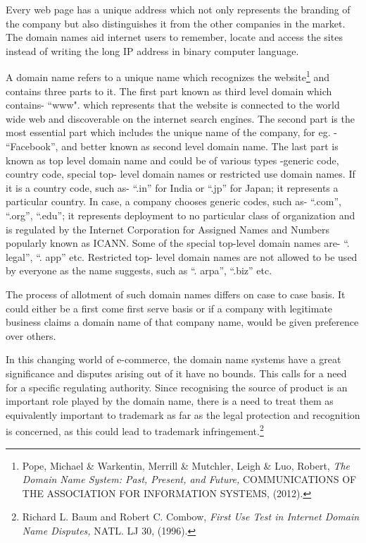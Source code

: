 \begin{multicols}{2}



\noi
Every web page has a unique address which not only represents the branding of the company
but also distinguishes it from the other companies in the market. The domain names aid
internet users to remember, locate and access the sites instead of writing the long IP address
in binary computer language.

\noi
A domain name refers to a unique name which recognizes the website\footnote{Pope, Michael \& Warkentin, Merrill \& Mutchler, Leigh \& Luo, Robert, \textit{The Domain Name System: Past, Present, and Future,} COMMUNICATIONS OF THE ASSOCIATION FOR INFORMATION SYSTEMS, (2012).}
 and contains three parts to it. The first part known as third level domain which contains- “www". which
represents that the website is connected to the world wide web and discoverable on the
internet search engines. The second part is the most essential part which includes the unique
name of the company, for eg. - “Facebook”, and better known as second level domain name.
The last part is known as top level domain name and could be of various types -generic code,
country code, special top- level domain names or restricted use domain names. If it is a
country code, such as- “.in” for India or “.jp” for Japan; it represents a particular country. In
case, a company chooses generic codes, such as- “.com”, “.org”, “.edu”; it represents
deployment to no particular class of organization and is regulated by the Internet Corporation
for Assigned Names and Numbers popularly known as ICANN. Some of the special top-level
domain names are- “. legal”, “. app” etc. Restricted top- level domain names are not allowed
to be used by everyone as the name suggests, such as “. arpa”, “.biz” etc.

\newpage

\noi
The process of allotment of such domain names differs on case to case basis. It could either
be a first come first serve basis or if a company with legitimate business claims a domain
name of that company name, would be given preference over others.

\vspace{-.1cm}

\noi
In this changing world of e-commerce, the domain name systems have a great significance
and disputes arising out of it have no bounds. This calls for a need for a specific regulating
authority. Since recognising the source of product is an important role played by the domain
name, there is a need to treat them as equivalently important to trademark as far as the legal
protection and recognition is concerned, as this could lead to trademark infringement.\footnote{Richard L. Baum and Robert C. Combow, \textit{First Use Test in Internet Domain Name Disputes,} NATL. LJ 30, (1996).}


\end{multicols}
